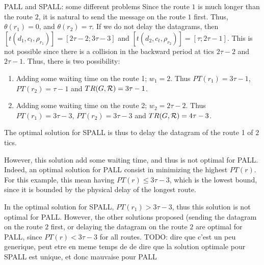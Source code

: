 \documentclass[10pt]{article}
\newcommand{\todo}[1]{{\color{red} TODO: {#1}}}
\newcommand\pall{\textsc{PALL}\xspace}
\newcommand\spall{\textsc{SPALL}\xspace}
\begin{document}
\begin{subsection}{\pall and \spall: some different problems}
Since the route $1$ is much longer than the route $2$, it is natural to send the message on the route $1$ first. 
Thus, $\theta(r_1) = 0$, and $\theta (r_2) = \tau $.\newline
If we do not delay the datagrams, then $[t(d_1,c_t,\rho_{r_1})] = [2\tau -2;3\tau-3]$ and $[t(d_2,c_t,\rho_{r_2})] = [\tau;2\tau-1]$. This is not possible since there is a collision in the backward period at tics $2\tau-2$ and $2\tau-1$.
  Thus, there is two possibility: 
  \begin{enumerate}
                                                                                                                                                                                                                                                                                                                                                                                                                                               \item Adding some waiting time on the route 1; $w_1 = 2$. Thus $PT(r_1) = 3\tau-1$, $PT(r_2) = \tau -1$ and $TR(G,{\cal R}) =3\tau-1$. 
\item Adding some waiting time on the route 2; $w_2 = 2\tau-2$. Thus $PT(r_1) = 3\tau-3$, $PT(r_2) = 3\tau -3$ and $TR(G,{\cal R}) = 4\tau-3$.                                                                                                                                                                                                                                                             \end{enumerate}
The optimal solution for \spall is thus to delay the datagram of the route 1 of $2$ tics.

However, this solution add some waiting time, and thus is not optimal for \pall. Indeed, an optimal solution for \pall consist in minimizing the highest $PT(r)$. For this example, this mean having $PT(r) \leq 3\tau-3$, which is the lowest bound, since it is bounded by the physical delay of the longest route.\newline

In the optimal solution for \spall, $PT(r_1) > 3\tau-3$, thus this solution is not optimal for \pall. 
However, the other solutions proposed (sending the datagram on the route $2$ first, or delaying the datagram on the route $2$ are optimal for \pall, since $PT(r) < 3\tau-3$ for all routes.
\todo{dire que c'est un peu generique, peut etre en meme temps de de dire que la solution optimale pour SPALL est unique, et donc mauvaise pour PALL}


\end{subsection}
\end{document}

